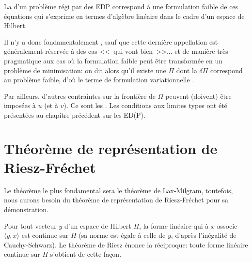 \medskip
La  d'un problème régi par des EDP correspond
à une formulation faible de ces équations qui s'exprime en termes d'algèbre linéaire dans
le cadre d'un espace de Hilbert.

Il n'y a donc fondamentalement , sauf que cette dernière appellation est généralement réservée à
des cas <<~qui vont bien~>>... et de manière très pragmatique aux cas où
la formulation faible peut être transformée en un problème de minimisation:
on dit alors qu'il existe une  $\Pi$ dont la
 $\delta\Pi$ correspond au problème faible, d'où
le terme de formulation variationnelle .

\medskip
Par ailleurs, d'autres contraintes sur la frontière de $\Omega$ peuvent (doivent) être
imposées à $u$ (et à $v$). Ce sont les .
Les conditions aux limites types ont été présentées au chapitre précédent
sur les ED(P).

\medskip
\section{Théorème de représentation de Riesz-Fréchet}
Le théorème le plus fondamental sera le théorème de Lax-Milgram, toutefois,
nous aurons besoin du théorème de représentation de Riesz-Fréchet pour sa démonstration.

\medskip
Pour tout vecteur $y$ d'un espace de Hilbert $H$, la forme linéaire qui à $x$ associe $\langle y,x\rangle$
est continue sur $H$ (sa norme est égale à celle de $y$, d'après l'inégalité de Cauchy-Schwarz).
Le théorème de Riesz énonce la réciproque: toute forme linéaire continue sur $H$ s'obtient de cette
façon.

